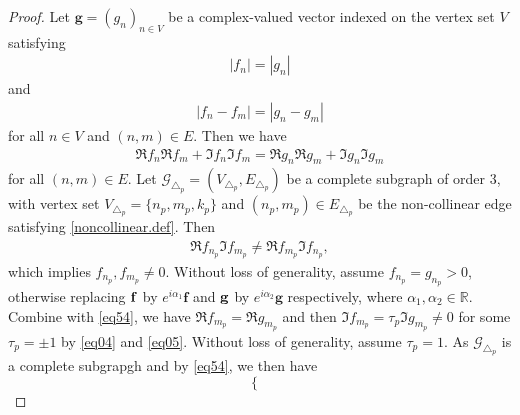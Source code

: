 \documentclass[12pt,oneside,reqno]{amsart}
\newcommand{\R}{\mathbb{R}}
\numberwithin{equation}{section}
\begin{document}
	\begin{proof}
		Let $\mathbf{g}=({g}_n)_{n\in V}$ be a complex-valued vector indexed on the vertex set $V$ satisfying 
		\begin{align}\label{eq04}
			|{f}_n| = |{g}_n|
		\end{align}
		and
		\begin{align*}
			|{f}_n - {f}_m| = |{g}_n - {g}_m|
		\end{align*}
		for all $n\in V$ and $(n,m)\in E$.
		Then we have
		\begin{align}\label{eq54}
			\Re f_n \Re f_m + \Im f_n \Im f_m
			=\Re g_n \Re g_m + \Im g_n \Im g_m
		\end{align}
		for all $(n,m)\in E$. 
	Let $\mathcal{G}_{\triangle_p}=(V_{\triangle_p},E_{\triangle_p})$  be a  complete subgraph  of order 3, with vertex set $V_{\triangle_p}=\{n_p, m_p, k_p\}$ and  $(n_p, m_p)\in E_{\triangle_p}$ be the non-collinear edge satisfying \eqref{noncollinear.def}. Then 
		\begin{align}\label{eq05}
			\Re f_{n_p} \Im f_{m_p} \ne \Re f_{m_p} \Im f_{n_p},
		\end{align}
		which implies $f_{n_p}, f_{m_p}\ne 0$. Without loss of generality, assume $f_{n_p}=g_{n_p}>0$, otherwise replacing $\bf f$ by $ e^{i\alpha_1}\mathbf{f}$ and $\bf g$ by $ e^{i\alpha_2}\mathbf{g} $ respectively, where $\alpha_1, \alpha_2\in \R$. Combine with \eqref{eq54}, we have $\Re f_{m_p}= \Re g_{m_p}$ and then $\Im f_{m_p}= \tau_p \Im g_{m_p}\ne 0$ for some $\tau_p=\pm 1$ by \eqref{eq04} and \eqref{eq05}. Without loss of generality, assume $\tau_p= 1$.
 		As $\mathcal{G}_{\triangle_p}$ is a complete subgrapgh and by \eqref{eq54}, we then have
		\begin{equation*}
			\left\{ \begin{array}{ll}
				

\end{array}
\end{equation*}
\end{proof}
\end{document}
